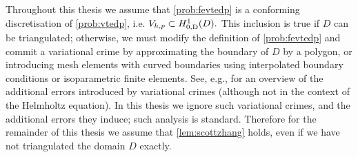    
    \label{rem:crimes}
    Throughout this thesis we assume that \cref{prob:fevtedp} is a conforming discretisation of \cref{prob:vtedp}, i.e. $\Vhp \subset \HozDD.$ This inclusion is true if $D$ can be triangulated; otherwise, we must modify the definition of \cref{prob:fevtedp} and commit a variational crime by approximating the boundary of $D$ by a polygon, or introducing mesh elements with curved boundaries using interpolated boundary conditions or isoparametric finite elements. See, e.g., \cite[Chapter 10]{BrSc:08} for an overview of the additional errors introduced by variational crimes (although not in the context of the Helmholtz equation). In this thesis we  ignore such variational crimes, and the additional errors they induce; such analysis is standard. Therefore for the remainder of this thesis we assume that \cref{lem:scottzhang} holds, even if we have not triangulated the domain $D$ exactly.
    \ere
    




